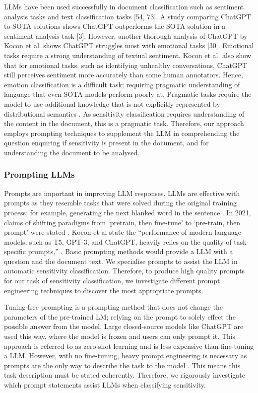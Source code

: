 LLMs have been used successfully in document classification such as sentiment analysis tasks \cite{gao2020making, qin2023chatgpt, amin2023will} and text classification tasks [54, 73]. A study comparing ChatGPT to SOTA solutions shows ChatGPT outperforms the SOTA solution in a sentiment analysis task [3]. However, another thorough analysis of ChatGPT by Kocon et al. shows ChatGPT struggles most with emotional tasks [30]. Emotional tasks require a strong understanding of textual sentiment. Kocon et al. also show that for emotional tasks, such as identifying unhealthy conversations, ChatGPT still perceives sentiment more accurately than some human annotators. Hence, emotion classification is a difficult task; requiring pragmatic understanding of language that even SOTA models perform poorly at. Pragmatic tasks require the model to use additional knowledge that is not explicitly represented by distributional semantics \cite{kocon2023chatgpt}. As sensitivity classification requires understanding of the content in the document, this is a pragmatic task. Therefore, our approach employs prompting techniques to supplement the LLM in comprehending the question enquiring if sensitivity is present in the document, and for understanding the document to be analysed.

\subsubsection{Prompting LLMs}
Prompts are important in improving LLM responses. LLMs are effective with prompts as they resemble tasks that were solved during the original training process; for example, generating the next blanked word in the sentence \cite{liu2023pre}. In 2021, claims of shifting paradigms from ‘pretrain, then fine-tune’ to ‘pre-train, then prompt’ were stated \cite{liu2023pre}. Kocon et al state the “performance of modern language models, such as T5, GPT-3, and ChatGPT, heavily relies on the quality of task-specific prompts,” \cite{kocon2023chatgpt}. Basic prompting methods would provide a LLM with a question and the document text. We specialise prompts to assist the LLM in automatic sensitivity classification. Therefore, to produce high quality prompts for our task of sensitivity classification, we investigate different prompt engineering techniques to discover the most appropriate prompts.

Tuning-free prompting is a prompting method that does not change the parameters of the pre-trained LM; relying on the prompt to solely effect the possible answer from the model. Large closed-source models like ChatGPT \cite{brown2020language} are used this way, where the model is frozen and users can only prompt it. This approach is referred to as zero-shot learning and is less expensive than fine-tuning a LLM. However, with no fine-tuning, heavy prompt engineering is necessary as prompts are the only way to describe the task to the model \cite{liu2023pre}. This means this task description must be stated coherently. Therefore, we rigorously investigate which prompt statements assist LLMs when classifying sensitivity.

